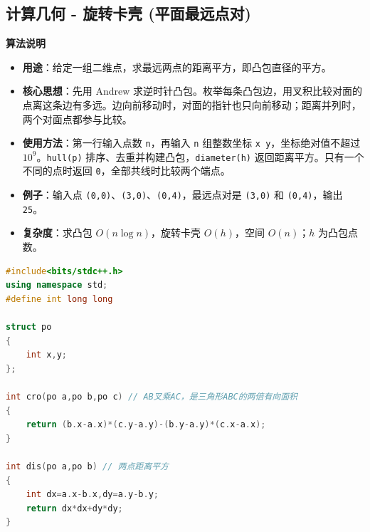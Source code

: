 \documentclass[10pt,landscape,a4paper]{article}
\begin{document}
\begin{multicols*}{3}
\subsection*{计算几何 - 旋转卡壳 (平面最远点对)}
\par\addvspace{0.7ex}\noindent\textbf{算法说明}\par\nobreak
\begin{itemize}
\item \textbf{用途}：给定一组二维点，求最远两点的距离平方，即凸包直径的平方。
\item \textbf{核心思想}：先用 Andrew 求逆时针凸包。枚举每条凸包边，用叉积比较对面的点离这条边有多远。边向前移动时，对面的指针也只向前移动；距离并列时，两个对面点都参与比较。
\item \textbf{使用方法}：第一行输入点数 \texttt{n}，再输入 \texttt{n} 组整数坐标 \texttt{x\allowbreak{} \allowbreak{}y}，坐标绝对值不超过 $10^9$。\texttt{h\allowbreak{}u\allowbreak{}l\allowbreak{}l\allowbreak{}(\allowbreak{}p\allowbreak{})} 排序、去重并构建凸包，\texttt{d\allowbreak{}i\allowbreak{}a\allowbreak{}m\allowbreak{}e\allowbreak{}t\allowbreak{}e\allowbreak{}r\allowbreak{}(\allowbreak{}h\allowbreak{})} 返回距离平方。只有一个不同的点时返回 \texttt{0}，全部共线时比较两个端点。
\item \textbf{例子}：输入点 \texttt{(\allowbreak{}0\allowbreak{},\allowbreak{}0\allowbreak{})}、\texttt{(\allowbreak{}3\allowbreak{},\allowbreak{}0\allowbreak{})}、\texttt{(\allowbreak{}0\allowbreak{},\allowbreak{}4\allowbreak{})}，最远点对是 \texttt{(\allowbreak{}3\allowbreak{},\allowbreak{}0\allowbreak{})} 和 \texttt{(\allowbreak{}0\allowbreak{},\allowbreak{}4\allowbreak{})}，输出 \texttt{2\allowbreak{}5}。
\item \textbf{复杂度}：求凸包 $O(n\log n)$，旋转卡壳 $O(h)$，空间 $O(n)$；$h$ 为凸包点数。
\end{itemize}
\par{}\par
\begin{lstlisting}[language=C++]
#include<bits/stdc++.h>
using namespace std;
#define int long long

struct po
{
    int x,y;
};

int cro(po a,po b,po c) // AB叉乘AC，是三角形ABC的两倍有向面积
{
    return (b.x-a.x)*(c.y-a.y)-(b.y-a.y)*(c.x-a.x);
}

int dis(po a,po b) // 两点距离平方
{
    int dx=a.x-b.x,dy=a.y-b.y;
    return dx*dx+dy*dy;
}


\end{lstlisting}
\end{multicols*}
\end{document}
